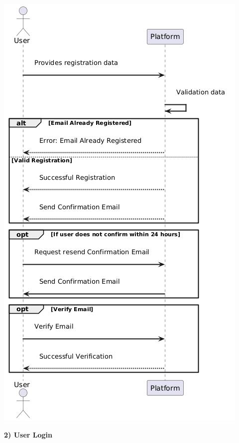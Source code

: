 \begin{center}
    \includegraphics[scale = 0.8]{Images/ImagesRASD/user_registration.png}
\end{center}
\newpage
\textbf{2) User Login}\\

